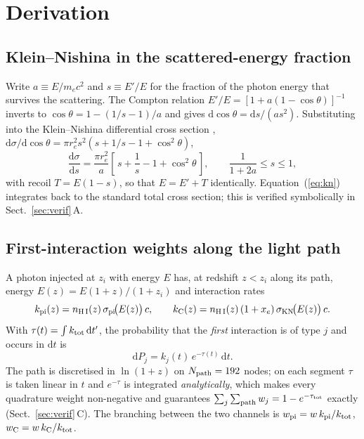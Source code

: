 \documentclass[11pt,a4paper]{article}
\begin{document}
\section{Derivation}\label{sec:deriv}

\subsection{Klein--Nishina in the scattered-energy fraction}

Write $a \equiv E/m_ec^2$ and $s \equiv E'/E$ for the fraction of the photon
energy that survives the scattering. The Compton relation
$E'/E = [1+a(1-\cos\theta)]^{-1}$ inverts to
$\cos\theta = 1-(1/s-1)/a$ and gives $\mathrm{d}\cos\theta = \mathrm{d}s/(a s^2)$.
Substituting into the Klein--Nishina differential cross section
\citep[][Eq.~7.5]{klein29,rl79},
$\mathrm{d}\sigma/\mathrm{d}\cos\theta = \pi r_e^2 s^2 (s + 1/s - 1 + \cos^2\theta)$,
\begin{equation}
  \frac{\mathrm{d}\sigma}{\mathrm{d}s}
  = \frac{\pi r_e^{2}}{a}\left[\,s + \frac{1}{s} - 1 + \cos^{2}\theta\,\right],
  \qquad
  \frac{1}{1+2a} \le s \le 1 ,
  \label{eq:kn}
\end{equation}
with recoil $T = E(1-s)$, so that $E = E' + T$ identically. Equation~(\ref{eq:kn})
integrates back to the standard total cross section; this is verified
symbolically in Sect.~\ref{sec:verif}\,A.

\subsection{First-interaction weights along the light path}

A photon injected at $z_i$ with energy $E$ has, at redshift $z<z_i$ along its
path, energy $E(z) = E(1+z)/(1+z_i)$ and interaction rates
\begin{equation}
  k_{\rm pi}(z) = n_{\rm H\,I}(z)\,\sigma_{\rm pi}\!\big(E(z)\big)\,c ,
  \qquad
  k_{\rm C}(z) = n_{\rm H\,I}(z)\,(1+x_e)\,\sigma_{\rm KN}\!\big(E(z)\big)\,c .
\end{equation}
With $\tau(t)=\int k_{\rm tot}\,\mathrm{d}t'$, the probability that the
\emph{first} interaction is of type $j$ and occurs in $\mathrm{d}t$ is
\begin{equation}
  \mathrm{d}P_j = k_j(t)\,e^{-\tau(t)}\,\mathrm{d}t .
  \label{eq:firstint}
\end{equation}
The path is discretised in $\ln(1+z)$ on $N_{\rm path}=192$ nodes; on each
segment $\tau$ is taken linear in $t$ and $e^{-\tau}$ is integrated
\emph{analytically}, which makes every quadrature weight non-negative and
guarantees $\sum_j\sum_{\rm path} w_j = 1-e^{-\tau_{\rm tot}}$ exactly
(Sect.~\ref{sec:verif}\,C). The branching between the two channels is
$w_{\rm pi} = w\,k_{\rm pi}/k_{\rm tot}$, $w_{\rm C} = w\,k_{\rm C}/k_{\rm tot}$.
\end{document}
